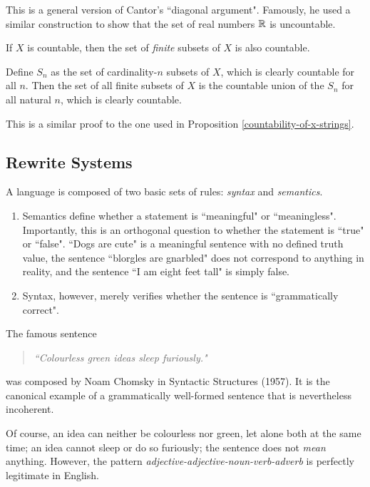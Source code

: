 \documentclass{article}
\begin{document}
\begin{note}
	This is a general version of Cantor's ``diagonal argument". Famously, he used a similar construction to show that the set of real numbers $\mathbb{R}$ is uncountable.
\end{note}

\begin{proposition}
	\label{finite-subsets-countable}
	If $X$ is countable, then the set of \textit{finite} subsets of $X$ is also countable.
\end{proposition}

\begin{prf}
	Define $S_n$ as the set of cardinality-$n$ subsets of $X$, which is clearly countable for all $n$. Then the set of all finite subsets of $X$ is the countable union of the $S_n$ for all natural $n$, which is clearly countable.
\end{prf}

\begin{note}
	This is a similar proof to the one used in Proposition \ref{countability-of-x-strings}.
\end{note}

\subsection{Rewrite Systems}

A language is composed of two basic sets of rules: \textit{syntax} and \textit{semantics}.
\begin{enumerate}
	\item Semantics define whether a statement is ``meaningful" or ``meaningless". Importantly, this is an orthogonal question to whether the statement is ``true" or ``false". ``Dogs are cute" is a meaningful sentence with no defined truth value, the sentence ``blorgles are gnarbled" does not correspond to anything in reality, and the sentence ``I am eight feet tall" is simply false.
	\item Syntax, however, merely verifies whether the sentence is ``grammatically correct".
\end{enumerate}

\begin{example}
	The famous sentence
	\begin{quotation}
		\textit{``Colourless green ideas sleep furiously."}
	\end{quotation}
	was composed by Noam Chomsky in Syntactic Structures (1957). It is the canonical example of a grammatically well-formed sentence that is nevertheless incoherent. 
		
	Of course, an idea can neither be colourless nor green, let alone both at the same time; an idea cannot sleep or do so furiously; the sentence does not \textit{mean} anything. However, the pattern \textit{adjective-adjective-noun-verb-adverb} is perfectly legitimate in English.
\end{example}
\end{document}
